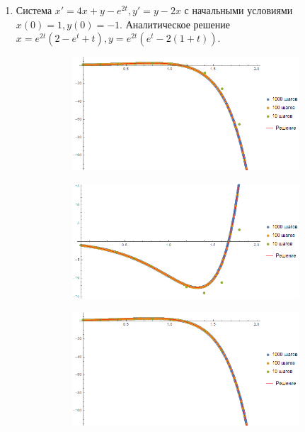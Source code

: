 \documentclass[a4paper,12pt,titlepage,finall]{article}
\begin{document}
\begin{enumerate}
\newpage
\item
Система $x' = 4x + y - e^{2t}, y' = y - 2x$ с начальными условиями $x(0) = 1, y(0)= -1$. Аналитическое решение $x = e^{2 t} (2 - e^t + t), y = e^{2 t} (e^t - 2 (1 + t))$.
\begin{figure}[h]
\centering
\begin{subfigure}{.5\textwidth}
  \centering
  \includegraphics[width=\textwidth]{test_1_6_2_x.png}
\end{subfigure}%
\begin{subfigure}{.5\textwidth}
  \centering
  \includegraphics[width=\textwidth]{test_1_6_2_y.png}
\end{subfigure}
\caption{Второй порядок точности, графики $x(t)$ и $y(t)$ соответственно}
\centering
\begin{subfigure}{.5\textwidth}
  \centering
  \includegraphics[width=\textwidth]{test_1_6_4_x.png}

\end{subfigure}
\end{figure}
\end{enumerate}
\end{document}
